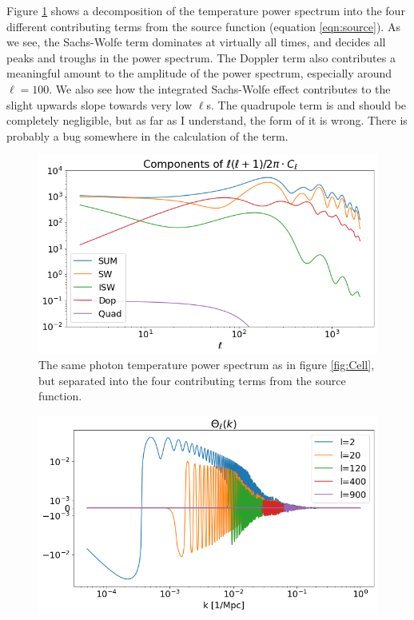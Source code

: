 \documentclass[10pt, a4paper]{article}
\begin{document}
Figure \ref{fig:Cell_all} shows a decomposition of the temperature power spectrum into the four different contributing terms from the source function (equation \ref{eqn:source}). As we see, the Sachs-Wolfe term dominates at virtually all times, and decides all peaks and troughs in the power spectrum. The Doppler term also contributes a meaningful amount to the amplitude of the power spectrum, especially around $\ell=100$. We also see how the integrated Sachs-Wolfe effect contributes to the slight upwards slope towards very low $\ell$s. The quadrupole term is and should be completely negligible, but as far as I understand, the form of it is wrong. There is probably a bug somewhere in the calculation of the term.

\begin{figure}[h!]
    \centering
    \includegraphics[scale=0.5]{../m4_figs/Cell_all.png}
    \caption{The same photon temperature power spectrum as in figure \ref{fig:Cell}, but separated into the four contributing terms from the source function.}
    \label{fig:Cell_all}
\end{figure}


\begin{figure}[h!]
    \centering
    \includegraphics[scale=0.5]{../m4_figs/Theta.png}
    \caption{}
    \label{}
\end{figure}
\end{document}
